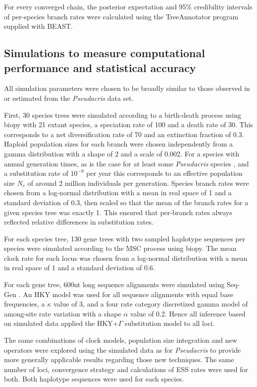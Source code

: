 \documentclass[nogrid]{MBE}%
\begin{document}
For every converged chain, the posterior expectation and 95\% credibility
intervals of per-species branch rates were calculated using the TreeAnnotator
program supplied with BEAST.

\subsection{Simulations to measure computational performance and statistical accuracy}

All simulation parameters were chosen to be broadly similar to those observed in
or estimated from the \textit{Pseudacris} data set.

First, 30 species trees were simulated according to a birth-death process
\citep{Gernhard2008769} using biopy with 21 extant species, a speciation rate
of 100 and a death rate of 30. This corresponds to a net diversification rate
of 70 and an extinction fraction of 0.3. Haploid population sizes for each
branch were chosen independently from a gamma distribution with a shape of 2
and a scale of 0.002. For a species with annual generation times, as is the
case for at least some \textit{Pseudacris} species \citep{10.2307/1446044},
and a substitution rate of $10^{-9}$ per year this corresponds to an effective
population size $N_e$ of around 2 million individuals per generation. Species
branch rates were chosen from a log-normal distribution with a mean in real
space of 1 and a standard deviation of 0.3, then scaled so that the mean of
the branch rates for a given species tree was exactly 1. This ensured that
per-branch rates always reflected relative differences in substitution rates.

For each species tree, 130 gene trees with two sampled haplotype sequences per
species were simulated according to the MSC process using biopy. The mean
clock rate for each locus was chosen from a log-normal distribution with a
mean in real space of 1 and a standard deviation of 0.6.

For each gene tree, 600nt long sequence alignments were simulated using Seq-
Gen \citep{Rambaut01061997}. An HKY model was used for all sequence alignments
with equal base frequencies, a $\kappa$ value of 3, and a four rate category
discretized gamma model of among-site rate variation with a shape $\alpha$
value of 0.2. Hence all inference based on simulated data applied the HKY+$\Gamma$
substitution model to all loci.

The same combinations of clock models, population size integration and new
operators were explored using the simulated data as for \textit{Pseudacris} to
provide more generally applicable results regarding those new techniques. The
same number of loci, convergence strategy and calculations of ESS rates were
used for both. Both haplotype sequences were used for each species.
\end{document}
